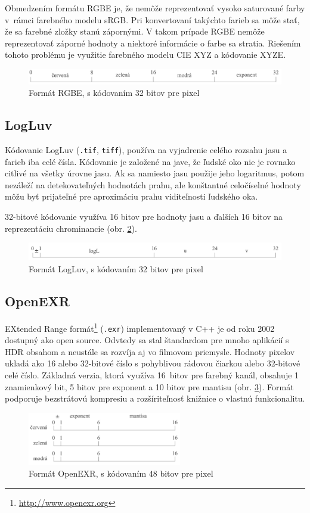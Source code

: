 Obmedzením formátu RGBE je, že nemôže reprezentovať vysoko saturované farby v~rámci farebného modelu sRGB. Pri konvertovaní
takýchto farieb sa môže stať, že sa farebné zložky stanú zápornými. V takom prípade RGBE nemôže reprezentovať záporné hodnoty
a niektoré informácie o farbe sa stratia. Riešením tohoto problému je využitie farebného modelu CIE XYZ a kódovanie XYZE. \cite{AHDR}

\begin{figure}[h!]
  \centering
  \includegraphics[width=1\textwidth]{figures/storage/rgbe}
  \caption{Formát RGBE, s kódovaním 32 bitov pre pixel}
  \label{fig:rgbe}
\end{figure}

\subsection*{LogLuv}

Kódovanie LogLuv (\texttt{.tif}, \texttt{tiff}), používa na vyjadrenie celého rozsahu jasu a farieb iba celé čísla. Kódovanie
je založené na jave, že ľudské oko nie je rovnako citlivé na všetky úrovne jasu. Ak sa namiesto jasu použije jeho logaritmus,
potom nezáleží na detekovateľných hodnotách prahu, ale konštantné celočíselné hodnoty môžu byť prijateľné pre aproximáciu 
prahu viditeľnosti ľudského oka. \cite{HDRI}

32-bitové kódovanie využíva 16 bitov pre hodnoty jasu a ďalších 16 bitov na reprezentáciu chrominancie (obr. \ref{fig:logluv}).

\begin{figure}[h!]
  \centering
  \includegraphics[width=1\textwidth]{figures/storage/logluv}
  \caption{Formát LogLuv, s kódovaním 32 bitov pre pixel}
  \label{fig:logluv}
\end{figure}

\subsection*{OpenEXR}

EXtended Range formát\footnote{\url{http://www.openexr.org}} (\texttt{.exr}) implementovaný v C++ je od roku 2002 dostupný ako open source.
Odvtedy sa stal štandardom pre mnoho aplikácií s HDR obsahom a neustále sa rozvíja aj vo filmovom priemysle. Hodnoty pixelov ukladá
ako 16 alebo 32-bitové číslo s pohyblivou rádovou čiarkou alebo 32-bitové celé číslo. Základná verzia, ktorá využíva 16~bitov
pre farebný kanál, obsahuje 1 znamienkový bit, 5 bitov pre exponent a 10 bitov pre mantisu (obr. \ref{fig:exr}). Formát podporuje
bezstrátovú kompresiu a rozšíriteľnosť knižnice o vlastnú funkcionalitu. \cite{HDRI}

\begin{figure}[h!]
  \centering
  \includegraphics[width=0.6\textwidth]{figures/storage/exr}
  \caption{Formát OpenEXR, s kódovaním 48 bitov pre pixel}
  \label{fig:exr}
\end{figure}